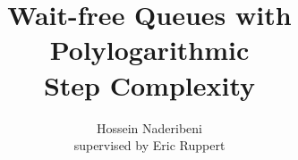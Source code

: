 \documentclass[12pt]{article}
\begin{document}
\title{Wait-free Queues with Polylogarithmic\\ Step Complexity}
\author{Hossein Naderibeni \\supervised by Eric Ruppert}
\maketitle

\end{document}
